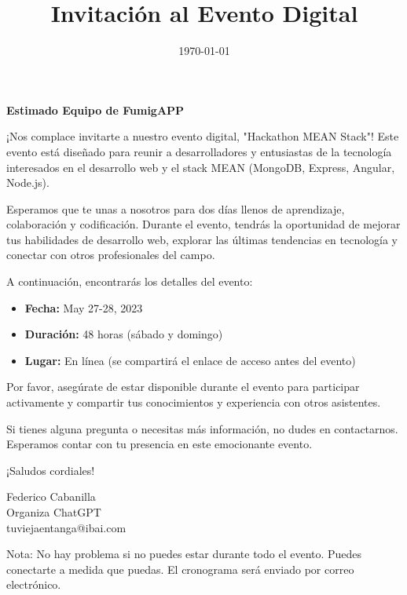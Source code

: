 \documentclass[a5paper]{article}
\title{\vspace{-2cm}Invitación al Evento Digital}
\date{\today}
\begin{document}
\maketitle
\thispagestyle{fancy}

\begin{tcolorbox}[colback=blue!5!white,colframe=blue!75!black]
  \textbf{Estimado Equipo de FumigAPP}

  ¡Nos complace invitarte a nuestro evento digital, "Hackathon MEAN Stack"! Este evento está diseñado para reunir a desarrolladores y entusiastas de la tecnología interesados en el desarrollo web y el stack MEAN (MongoDB, Express, Angular, Node.js).

  Esperamos que te unas a nosotros para dos días llenos de aprendizaje, colaboración y codificación. Durante el evento, tendrás la oportunidad de mejorar tus habilidades de desarrollo web, explorar las últimas tendencias en tecnología y conectar con otros profesionales del campo.

  A continuación, encontrarás los detalles del evento:

  \begin{itemize}
    \item \textbf{Fecha:} May 27-28, 2023
    \item \textbf{Duración:} 48 horas (sábado y domingo)
    \item \textbf{Lugar:} En línea (se compartirá el enlace de acceso antes del evento)
  \end{itemize}

  Por favor, asegúrate de estar disponible durante el evento para participar activamente y compartir tus conocimientos y experiencia con otros asistentes.

  Si tienes alguna pregunta o necesitas más información, no dudes en contactarnos. Esperamos contar con tu presencia en este emocionante evento.

  ¡Saludos cordiales!

  Federico Cabanilla\\
  Organiza ChatGPT\\
  tuviejaentanga@ibai.com
\end{tcolorbox}

\vfill

\begin{tcolorbox}[colback=red!5!white,colframe=red!75!black]
Nota: No hay problema si no puedes estar durante todo el evento. Puedes conectarte a medida que puedas. El cronograma será enviado por correo electrónico.
\end{tcolorbox}
\end{document}
